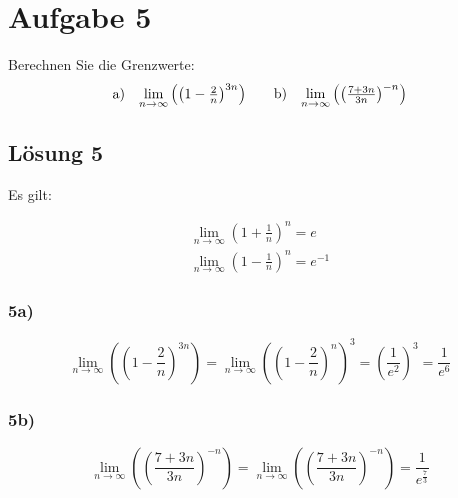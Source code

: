 \section*{Aufgabe 5}

Berechnen Sie die Grenzwerte:
\begin{align*}
  \begin{array}{ c c }
    \text{a)} & \lim\limits _{n\rightarrow \infty }\left(\left( 1-\frac{2}{n}\right)^{3n}\right)
  \end{array} & & \begin{array}{ c c }
    \text{b)} & \lim\limits _{n\rightarrow \infty }\left(\left(\frac{7+3n}{3n}\right)^{-n}\right)
  \end{array}
\end{align*}

\subsection*{Lösung 5}
Es gilt:

\begin{gather*}
  \lim _{n\rightarrow \infty }\left( 1+\frac{1}{n}\right)^{n} =e\\
  \lim _{n\rightarrow \infty }\left( 1-\frac{1}{n}\right)^{n} =e^{-1}
\end{gather*}

\subsubsection*{5a)}

\begin{equation*}
  \lim\limits _{n\rightarrow \infty }\left(\left( 1-\frac{2}{n}\right)^{3n}\right) =\lim\limits _{n\rightarrow \infty }\left(\left( 1-\frac{2}{n}\right)^{n}\right)^{3} =\left(\frac{1}{e^{2}}\right)^{3} =\frac{1}{e^{6}}
\end{equation*}

\subsubsection*{5b)}

\begin{equation*}
  \lim\limits _{n\rightarrow \infty }\left(\left(\frac{7+3n}{3n}\right)^{-n}\right) =\lim\limits _{n\rightarrow \infty }\left(\left(\frac{7+3n}{3n}\right)^{-n}\right) =\frac{1}{e^{\frac{7}{3}}}
\end{equation*}